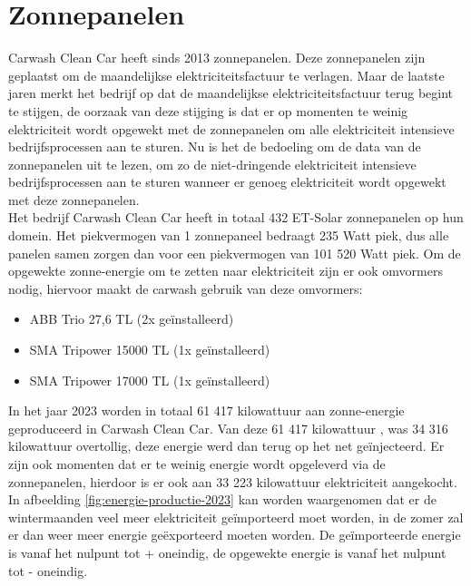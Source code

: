 \section{Zonnepanelen}
\label{sec:stand-van-zaken-zonnepanelen}

Carwash Clean Car heeft sinds 2013 zonnepanelen. Deze zonnepanelen zijn geplaatst om de maandelijkse elektriciteitsfactuur te verlagen. Maar de laatste jaren merkt het bedrijf op dat de maandelijkse elektriciteitsfactuur terug begint te stijgen, de oorzaak van deze stijging is dat er op momenten te weinig elektriciteit wordt opgewekt met de zonnepanelen om alle elektriciteit intensieve bedrijfsprocessen aan te sturen. Nu is het de bedoeling om de data van de zonnepanelen uit te lezen, om zo de niet-dringende elektriciteit intensieve bedrijfsprocessen aan te sturen wanneer er genoeg elektriciteit wordt opgewekt met deze zonnepanelen.\\ 

Het bedrijf Carwash Clean Car heeft in totaal 432 ET-Solar zonnepanelen op hun domein. Het piekvermogen van 1 zonnepaneel bedraagt 235 Watt piek, dus alle panelen samen zorgen dan voor een piekvermogen van 101 520 Watt piek. Om de opgewekte zonne-energie om te zetten naar elektriciteit zijn er ook omvormers nodig, hiervoor maakt de carwash gebruik van deze omvormers:

\begin{itemize}
    \item ABB Trio 27,6 TL (2x geïnstalleerd)
    \item SMA Tripower 15000 TL (1x geïnstalleerd)
    \item SMA Tripower 17000 TL (1x geïnstalleerd)
\end{itemize}

In het jaar 2023 worden in totaal 61 417 kilowattuur aan zonne-energie geproduceerd in Carwash Clean Car. Van deze 61 417 kilowattuur , was 34 316 kilowattuur overtollig, deze energie werd dan terug op het net geïnjecteerd. Er zijn ook momenten dat er te weinig energie wordt opgeleverd via de zonnepanelen, hierdoor is er ook aan 33 223 kilowattuur elektriciteit aangekocht. In afbeelding \ref{fig:energie-productie-2023} kan worden waargenomen dat er de wintermaanden veel meer elektriciteit geïmporteerd moet worden, in de zomer zal er dan weer meer energie geëxporteerd moeten worden. De geïmporteerde energie is vanaf het nulpunt tot + oneindig, de opgewekte energie is vanaf het nulpunt tot - oneindig.

